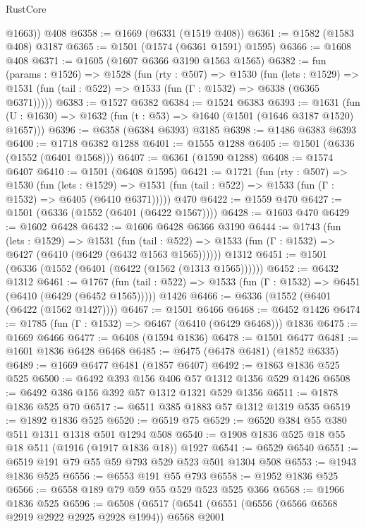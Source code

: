 \begin{lexlean}{RustCore}
\begin{coremodule}
        @1663))
    @408
@6358 := @1669 (@6331 (@1519 @408))
@6361 := @1582 (@1583 @408) @3187
@6365 := @1501 (@1574 (@6361 @1591) @1595)
@6366 := @1608 @408
@6371 := @1605 (@1607 @6366 @3190 @1563 @1565)
@6382 := fun (params : @1526) =>
  @1528
    (fun (rty : @507) =>
    @1530
      (fun (lets : @1529) =>
      @1531 (fun (tail : @522) => @1533 (fun (Γ : @1532) => @6338 (@6365 @6371)))))
@6383 := @1527 @6382
@6384 := @1524 @6383
@6393 := @1631 (fun (U : @1630) => @1632 (fun (t : @53) => @1640 (@1501 (@1646 @3187 @1520) @1657)))
@6396 := @6358 (@6384 @6393) @3185
@6398 := @1486 @6383 @6393
@6400 := @1718 @6382 @1288
@6401 := @1555 @1288
@6405 := @1501 (@6336 (@1552 (@6401 @1568)))
@6407 := @6361 (@1590 @1288)
@6408 := @1574 @6407
@6410 := @1501 (@6408 @1595)
@6421 := @1721
    (fun (rty : @507) =>
    @1530
      (fun (lets : @1529) =>
      @1531 (fun (tail : @522) => @1533 (fun (Γ : @1532) => @6405 (@6410 @6371)))))
    @470
@6422 := @1559 @470
@6427 := @1501 (@6336 (@1552 (@6401 (@6422 @1567))))
@6428 := @1603 @470
@6429 := @1602 @6428
@6432 := @1606 @6428 @6366 @3190
@6444 := @1743
    (fun (lets : @1529) =>
    @1531
      (fun (tail : @522) => @1533 (fun (Γ : @1532) => @6427 (@6410 (@6429 (@6432 @1563 @1565))))))
    @1312
@6451 := @1501 (@6336 (@1552 (@6401 (@6422 (@1562 (@1313 @1565))))))
@6452 := @6432 @1312
@6461 := @1767
    (fun (tail : @522) => @1533 (fun (Γ : @1532) => @6451 (@6410 (@6429 (@6452 @1565)))))
    @1426
@6466 := @6336 (@1552 (@6401 (@6422 (@1562 @1427))))
@6467 := @1501 @6466
@6468 := @6452 @1426
@6474 := @1785 (fun (Γ : @1532) => @6467 (@6410 (@6429 @6468))) @1836
@6475 := @1669 @6466
@6477 := @6408 (@1594 @1836)
@6478 := @1501 @6477
@6481 := @1601 @1836 @6428 @6468
@6485 := @6475 (@6478 @6481) (@1852 @6335)
@6489 := @1669 @6477 @6481 (@1857 @6407)
@6492 := @1863 @1836 @525 @525
@6500 := @6492 @393 @156 @406 @57 @1312 @1356 @529 @1426
@6508 := @6492 @386 @156 @392 @57 @1312 @1321 @529 @1356
@6511 := @1878 @1836 @525 @70
@6517 := @6511 @385 @1883 @57 @1312 @1319 @535
@6519 := @1892 @1836 @525
@6520 := @6519 @75
@6529 := @6520 @384 @55 @380 @511 @1311 @1318 @501 @1294 @508
@6540 := @1908 @1836 @525 @18 @55 @18 @511 (@1916 (@1917 @1836 @18)) @1927
@6541 := @6529 @6540
@6551 := @6519 @191 @79 @55 @59 @793 @529 @523 @501 @1304 @508
@6553 := @1943 @1836 @525
@6556 := @6553 @191 @55 @793
@6558 := @1952 @1836 @525
@6566 := @6558 @189 @79 @59 @55 @529 @523 @525 @366
@6568 := @1966 @1836 @525
@6596 := @6508
    (@6517
      (@6541
        (@6551
          (@6556 (@6566 @6568 @2919 @2922 @2925 @2928 @1994))
          @6568
          @2001

\end{coremodule}
\end{lexlean}

